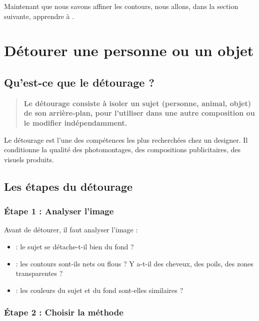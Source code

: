 Maintenant que nous savons affiner les contours, nous allons, dans la section suivante, apprendre à .

\section{Détourer une personne ou un objet}

\subsection{Qu'est-ce que le détourage ?}

\begin{quote}
\textbf{Le détourage consiste à isoler un sujet (personne, animal, objet) de son arrière-plan, pour l'utiliser dans une autre composition ou le modifier indépendamment.}
\end{quote}

Le détourage est l'une des compétences les plus recherchées chez un designer. Il conditionne la qualité des photomontages, des compositions publicitaires, des visuels produits.

\subsection{Les étapes du détourage}

\subsubsection{Étape 1 : Analyser l'image}

Avant de détourer, il faut analyser l'image :

\begin{itemize}
    \item {} : le sujet se détache-t-il bien du fond ?
    \item {} : les contours sont-ils nets ou flous ? Y a-t-il des cheveux, des poils, des zones transparentes ?
    \item {} : les couleurs du sujet et du fond sont-elles similaires ?
\end{itemize}

\subsubsection{Étape 2 : Choisir la méthode}


